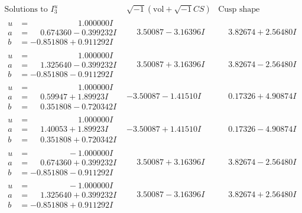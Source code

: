 \documentclass[1p]{elsarticle_modified}
\theoremstyle{definition}
\newcommand{\I}{\sqrt{-1}}
\begin{document}
$$\begin{array}{c|c|c}  
\text{Solutions to }I^u_{3}& \I (\text{vol} + \sqrt{-1}CS) & \text{Cusp shape}\\
 \hline 
\begin{aligned}
u &= \phantom{-0.000000 -}1.000000 I \\
a &= \phantom{-}0.674360 - 0.399232 I \\
b &= -0.851808 + 0.911292 I\end{aligned}
 & \phantom{-}3.50087 - 3.16396 I & \phantom{-}3.82674 + 2.56480 I \\ \hline\begin{aligned}
u &= \phantom{-0.000000 -}1.000000 I \\
a &= \phantom{-}1.325640 - 0.399232 I \\
b &= -0.851808 - 0.911292 I\end{aligned}
 & \phantom{-}3.50087 + 3.16396 I & \phantom{-}3.82674 - 2.56480 I \\ \hline\begin{aligned}
u &= \phantom{-0.000000 -}1.000000 I \\
a &= \phantom{-}0.59947 + 1.89923 I \\
b &= \phantom{-}0.351808 - 0.720342 I\end{aligned}
 & -3.50087 - 1.41510 I & \phantom{-}0.17326 + 4.90874 I \\ \hline\begin{aligned}
u &= \phantom{-0.000000 -}1.000000 I \\
a &= \phantom{-}1.40053 + 1.89923 I \\
b &= \phantom{-}0.351808 + 0.720342 I\end{aligned}
 & -3.50087 + 1.41510 I & \phantom{-}0.17326 - 4.90874 I \\ \hline\begin{aligned}
u &= \phantom{-0.000000 } -1.000000 I \\
a &= \phantom{-}0.674360 + 0.399232 I \\
b &= -0.851808 - 0.911292 I\end{aligned}
 & \phantom{-}3.50087 + 3.16396 I & \phantom{-}3.82674 - 2.56480 I \\ \hline\begin{aligned}
u &= \phantom{-0.000000 } -1.000000 I \\
a &= \phantom{-}1.325640 + 0.399232 I \\
b &= -0.851808 + 0.911292 I\end{aligned}
 & \phantom{-}3.50087 - 3.16396 I & \phantom{-}3.82674 + 2.56480 I \\ \hline\begin{aligned}

\end{aligned}
\end{array}$$
\end{document}
